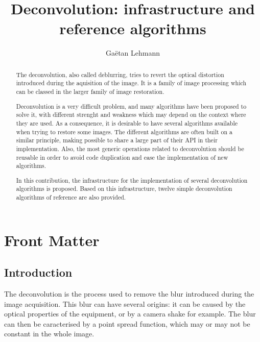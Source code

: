 \documentclass{InsightArticle}
\title{Deconvolution: infrastructure and reference algorithms}
\author{Ga\"etan Lehmann}
\newcommand{\IJhandlerIDnumber}{}
\begin{document}
%
% 
\IJhandlefooter{\IJhandlerIDnumber}

\maketitle

\ifhtml
\chapter*{Front Matter\label{front}}
\fi


\begin{abstract}
\noindent
The deconvolution, also called deblurring, tries to revert the optical distortion introduced during the aquisition of the image.
It is a family of image processing which can be classed in the larger family of image restoration.

Deconvolution is a very difficult problem, and many algorithms have been proposed to solve it, with different strenght and weakness
which may depend on the context where they are used. As a consequence, it is desirable to have several algorithms available when trying
to restore some images. The different algorithms are often built on a similar principle, making possible to share a large part of their
API in their implementation. Also, the most generic operations related to deconvolution should be reusable in order to avoid code
duplication and ease the implementation of new algorithms.

In this contribution, the infrastructure for the implementation of several deconvolution algorithms is proposed. Based on this
infrastructure, twelve simple deconvolution algorithms of reference are also provided.
\end{abstract}

\IJhandlenote{\IJhandlerIDnumber}

\tableofcontents


\section{Introduction}

The deconvolution is the process used to remove the blur introduced during the image acquisition. This blur can have several
origins: it can be caused by the optical properties of the equipment, or by a camera shake for example. The blur can then be
caracterised by a point spread function, which may or may not be constant in the whole image.
\end{document}
